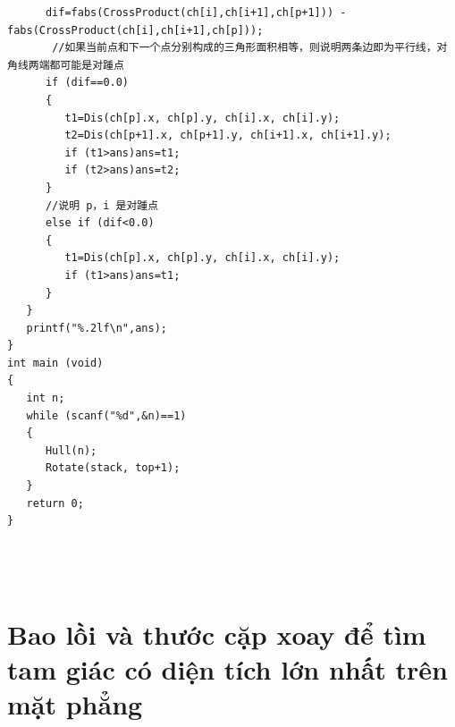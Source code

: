 \documentclass[11pt]{article}
\begin{document}
\begin{verbatim}
      dif=fabs(CrossProduct(ch[i],ch[i+1],ch[p+1])) - fabs(CrossProduct(ch[i],ch[i+1],ch[p]));
       //如果当前点和下一个点分别构成的三角形面积相等，则说明两条边即为平行线，对
角线两端都可能是对踵点
      if (dif==0.0)
      {
         t1=Dis(ch[p].x, ch[p].y, ch[i].x, ch[i].y);
         t2=Dis(ch[p+1].x, ch[p+1].y, ch[i+1].x, ch[i+1].y);
         if (t1>ans)ans=t1;
         if (t2>ans)ans=t2;
      }
      //说明 p，i 是对踵点
      else if (dif<0.0)
      {
         t1=Dis(ch[p].x, ch[p].y, ch[i].x, ch[i].y);
         if (t1>ans)ans=t1;
      }
   }
   printf("%.2lf\n",ans);
}
int main (void)
{
   int n;
   while (scanf("%d",&n)==1)
   {
      Hull(n);
      Rotate(stack, top+1);
   }
   return 0;
}




\end{verbatim}
\endgroup
\section{Bao lồi và thước cặp xoay để tìm tam giác có diện tích lớn nhất trên mặt phẳng}
\begingroup
\scriptsize
\end{document}
